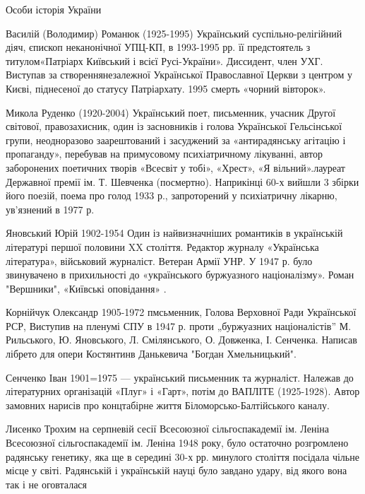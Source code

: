 
 
 
 
 

Особи історія України

Василій (Володимир) Романюк (1925-1995) Український суспільно-релігійний діяч, єпископ неканонічної УПЦ-КП, в 1993-1995 рр. її предстоятель з титулом«Патріарх Київський і всієї Русі-України». Диссидент, член УХГ. Виступав за створеннянезалежної Української Православної Церкви з центром у Києві, піднесеної до статусу Патріархату. 1995 смерть «чорний вівторок».

Микола Руденко (1920-2004) Український поет, письменник, учасник Другої світової, правозахисник, один із засновників і голова Української Гельсінської групи, неодноразово заарештований і засуджений за «антирадянську агітацію і пропаганду», перебував на примусовому психіатричному лікуванні, автор заборонених поетичних творів «Всесвіт у тобі», «Хрест», «Я вільний».лауреат Державної премії ім. Т. Шевченка (посмертно). Наприкінці 60-х вийшли 3 збірки його поезій, поема про голод 1933 р., запроторений у психіатричну лікарню, ув’язнений в 1977 р.

Яновський Юрій 1902-1954 Один із найвизначніших романтиків в українській літературі першої половини XX століття. Редактор журналу «Українська література», військовий журналіст. Ветеран Армії УНР. У 1947 р. було звинувачено в прихильності до «українського буржуазного націоналізму». Роман "Вершники", «Київські оповідання» .

Корнійчук Олександр 1905-1972 пмсьменник, Голова Верховної Ради Української РСР, Виступив на пленумі СПУ в 1947 р. проти „буржуазних націоналістів” М. Рильського, Ю. Яновського, Л. Смілянського, О. Довженка, І. Сенченка. Написав лібрето для опери Костянтинв Данькевича "Богдан Хмельницький".

Сенченко Іван 1901=1975 --- український письменник та журналіст. Належав до літературних організацій «Плуг» і «Гарт», потім до ВАПЛІТЕ (1925-1928). Автор замовних нарисів про концтабірне життя Біломорсько-Балтійського каналу.

Лисенко Трохим на серпневій сесії Всесоюзної сільгоспакадемії ім. Леніна Всесоюзної сільгоспакадемії ім. Леніна 1948 року, було остаточно розгромлено радянську генетику, яка ще в середині 30-х рр. минулого століття посідала чільне місце у світі. Радянській і українській науці було завдано удару, від якого вона так і не оговталася

